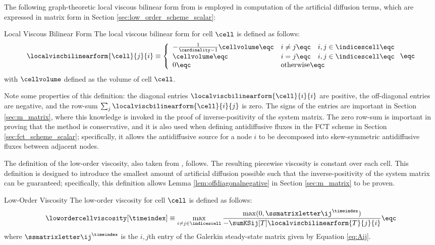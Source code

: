 The following graph-theoretic local viscous bilinear form from
\cite{guermond_firstorder} is employed in computation of the artificial
diffusion terms, which are expressed in matrix form in Section
\ref{sec:low_order_scheme_scalar}:
\begin{definition}{Local Viscous Bilinear Form}
   The local viscous bilinear form for cell $\cell$ is defined as follows:
   \begin{equation}\label{eq:bilinearform}
     \localviscbilinearform{\cell}{j}{i} \equiv \left\{\begin{array}{l l}
       -\frac{1}{\cardinality - 1}\cellvolume\eqc & i\ne j\eqc
       \quad i,j\in \indicescell\eqc \\
       \cellvolume\eqc & i = j \eqc \quad i,j\in \indicescell\eqc \\
       0          \eqc & \mbox{otherwise}\eqc
     \end{array}\right. \eqc
   \end{equation}
   with $\cellvolume$ defined as the volume of cell $\cell$.
\end{definition}
Note some properties of this definition: the diagonal entries
$\localviscbilinearform{\cell}{i}{i}$ are positive, the off-diagonal entries
are negative, and the row-sum $\sum_j\localviscbilinearform{\cell}{i}{j}$
is zero. The signs of the entries are important in Section \ref{sec:m_matrix},
where this knowledge is invoked in the proof of inverse-positivity of the
system matrix. The zero row-sum is important in proving that the method
is conservative, and it is also used when defining antidiffusive fluxes
in the FCT scheme in Section \ref{sec:fct_scheme_scalar}; specifically, it
allows the antidiffusive source for a node $i$ to be decomposed into
skew-symmetric antidiffusive fluxes between adjacent nodes.

The definition of the low-order viscosity, also taken from
\cite{guermond_firstorder}, follows. The resulting piecewise
viscosity is constant over each cell. This definition is designed to
introduce the smallest amount of artificial diffusion possible such that
the inverse-positivity of the system matrix can be guaranteed;
specifically, this definition allows Lemma \ref{lem:offdiagonalnegative}
in Section \ref{sec:m_matrix} to be proven.
\begin{definition}{Low-Order Viscosity}
   The low-order viscosity for cell $\cell$ is defined as follows:
   \begin{equation}
     \lowordercellviscosity[\timeindex] \equiv \max\limits_{i\ne j\in\indicescell}
     \frac{\max(0,\ssmatrixletter\ij^\timeindex)}
     {-\sumKSij[T]\localviscbilinearform{T}{j}{i}}
     \eqc
   \end{equation}
   where $\ssmatrixletter\ij^\timeindex$ is the $i,j$th entry of the Galerkin
   steady-state matrix given by Equation \eqref{eq:Aij}.
\end{definition}
